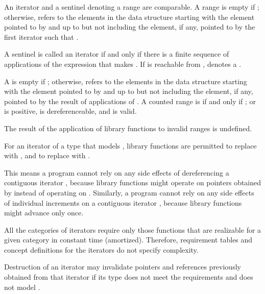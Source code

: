 \pnum
An iterator and a sentinel denoting a range are comparable.
A range 
is empty if ;
otherwise, 
refers to the elements in the data structure starting with the element
pointed to by
and up to but not including the element, if any, pointed to by
the first iterator  such that .

\pnum
A sentinel  is called  an iterator  if
and only if there is a finite sequence of applications of the expression
 that makes . If  is reachable from ,
 denotes a .

\pnum
A   is empty if ;
otherwise,  refers to
the  elements in the data structure
starting with the element pointed to by  and up to but not including
the element, if any, pointed to by
the result of  applications of .
A counted range  is  if and only if ;
or  is positive,  is dereferenceable,
and  is valid.

\pnum
The result of the application of library functions
to invalid ranges is undefined.

\pnum
For an iterator  of a type that
models ,
library functions are permitted
to replace  with
, and
to replace  with .
\begin{note}
This means a program cannot rely on any side effects of
dereferencing a contiguous iterator ,
because library functions might operate on
pointers obtained by 
instead of operating on .
Similarly, a program cannot rely on any side effects of
individual increments on a contiguous iterator ,
because library functions might advance  only once.
\end{note}

\pnum
All the categories of iterators require only those functions that are realizable for a given category in
constant time (amortized).
Therefore, requirement tables and concept definitions for the iterators
do not specify complexity.

\pnum
Destruction of an iterator may invalidate pointers and references previously
obtained from that iterator if its type does not meet the
 requirements and does not model .

